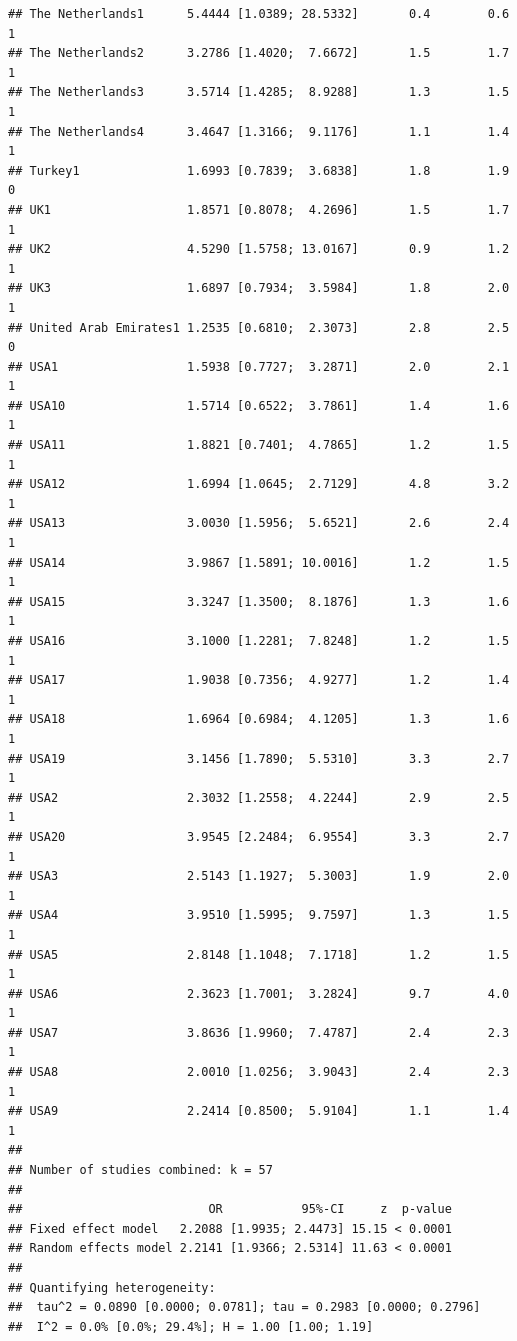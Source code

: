 \documentclass[
]{book}
\begin{document}
\begin{verbatim}
## The Netherlands1      5.4444 [1.0389; 28.5332]       0.4        0.6     1
## The Netherlands2      3.2786 [1.4020;  7.6672]       1.5        1.7     1
## The Netherlands3      3.5714 [1.4285;  8.9288]       1.3        1.5     1
## The Netherlands4      3.4647 [1.3166;  9.1176]       1.1        1.4     1
## Turkey1               1.6993 [0.7839;  3.6838]       1.8        1.9     0
## UK1                   1.8571 [0.8078;  4.2696]       1.5        1.7     1
## UK2                   4.5290 [1.5758; 13.0167]       0.9        1.2     1
## UK3                   1.6897 [0.7934;  3.5984]       1.8        2.0     1
## United Arab Emirates1 1.2535 [0.6810;  2.3073]       2.8        2.5     0
## USA1                  1.5938 [0.7727;  3.2871]       2.0        2.1     1
## USA10                 1.5714 [0.6522;  3.7861]       1.4        1.6     1
## USA11                 1.8821 [0.7401;  4.7865]       1.2        1.5     1
## USA12                 1.6994 [1.0645;  2.7129]       4.8        3.2     1
## USA13                 3.0030 [1.5956;  5.6521]       2.6        2.4     1
## USA14                 3.9867 [1.5891; 10.0016]       1.2        1.5     1
## USA15                 3.3247 [1.3500;  8.1876]       1.3        1.6     1
## USA16                 3.1000 [1.2281;  7.8248]       1.2        1.5     1
## USA17                 1.9038 [0.7356;  4.9277]       1.2        1.4     1
## USA18                 1.6964 [0.6984;  4.1205]       1.3        1.6     1
## USA19                 3.1456 [1.7890;  5.5310]       3.3        2.7     1
## USA2                  2.3032 [1.2558;  4.2244]       2.9        2.5     1
## USA20                 3.9545 [2.2484;  6.9554]       3.3        2.7     1
## USA3                  2.5143 [1.1927;  5.3003]       1.9        2.0     1
## USA4                  3.9510 [1.5995;  9.7597]       1.3        1.5     1
## USA5                  2.8148 [1.1048;  7.1718]       1.2        1.5     1
## USA6                  2.3623 [1.7001;  3.2824]       9.7        4.0     1
## USA7                  3.8636 [1.9960;  7.4787]       2.4        2.3     1
## USA8                  2.0010 [1.0256;  3.9043]       2.4        2.3     1
## USA9                  2.2414 [0.8500;  5.9104]       1.1        1.4     1
## 
## Number of studies combined: k = 57
## 
##                          OR           95%-CI     z  p-value
## Fixed effect model   2.2088 [1.9935; 2.4473] 15.15 < 0.0001
## Random effects model 2.2141 [1.9366; 2.5314] 11.63 < 0.0001
## 
## Quantifying heterogeneity:
##  tau^2 = 0.0890 [0.0000; 0.0781]; tau = 0.2983 [0.0000; 0.2796]
##  I^2 = 0.0% [0.0%; 29.4%]; H = 1.00 [1.00; 1.19]

\end{verbatim}
\end{document}
